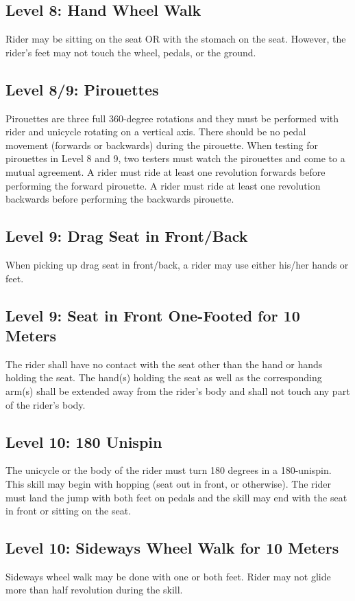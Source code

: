 \subsection{Level 8: Hand Wheel Walk}
Rider may be sitting on the seat OR with the stomach on the seat. However, the rider's feet may not touch the wheel,
pedals, or the ground.
\subsection{Level 8/9: Pirouettes}
Pirouettes are three full 360-degree rotations and they must be performed with rider and unicycle rotating on a vertical
axis. There should be no pedal movement (forwards or backwards) during the pirouette. When testing for pirouettes in
Level 8 and 9, two testers must watch the pirouettes and come to a mutual agreement. A rider must ride at least one
revolution forwards before performing the forward pirouette. A rider must ride at least one revolution backwards
before performing the backwards pirouette.
\subsection{Level 9: Drag Seat in Front/Back}
When picking up drag seat in front/back, a rider may use either his/her hands or feet.
\subsection{Level 9: Seat in Front One-Footed for 10 Meters}
The rider shall have no contact with the seat other than the hand or hands holding the seat. The hand(s) holding the seat
as well as the corresponding arm(s) shall be extended away from the rider’s body and shall not touch any part of the
rider's body.
\subsection{Level 10: 180 Unispin}
The unicycle or the body of the rider must turn 180 degrees in a 180-unispin. This skill may begin with hopping (seat
out in front, or otherwise). The rider must land the jump with both feet on pedals and the skill may end with the seat in
front or sitting on the seat.
\subsection{Level 10: Sideways Wheel Walk for 10 Meters}
Sideways wheel walk may be done with one or both feet. Rider may not glide more than half revolution during the skill.
